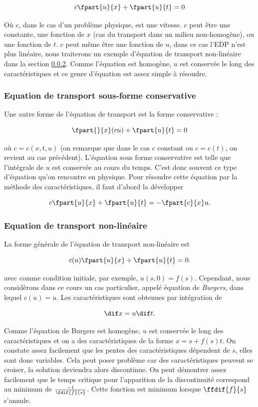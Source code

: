 $$c\fpart{u}{x} + \fpart{u}{t} = 0$$

Où $c$, dans le cas d'un problème physique, est une vitesse. $c$ peut être
une constante, une fonction de $x$ (cas du transport dans un milieu non-homogène),
ou une fonction de $t$. $c$ peut même être une fonction de $u$, dans ce cas
l'EDP n'est plus linéaire, nous traiterons un exemple d'équation de transport
non-linéaire dans la section \ref{sec:burgers}. Comme l'équation est homogène,
$u$ est conservée le long des caractéristiques et ce genre d'équation est assez
simple à résoudre.

\subsubsection{Equation de transport sous-forme conservative}
Une autre forme de l'équation de transport est la forme conservative :

$$\fpart{}{x}(cu) + \fpart{u}{t} = 0$$

où $c = c(x,t,u)$ (on remarque que dans le cas $c$ constant ou $c = c(t)$,
on revient au cas précédent). L'équation sous forme conservative est telle
que l'intégrale de $u$ est conservée au cours du temps. C'est donc souvent
ce type d'équation qu'on rencontre en physique. Pour résoudre cette équation
par la méthode des caractéristiques, il faut d'abord la développer

$$c\fpart{u}{x} + \fpart{u}{t} = -\fpart{c}{x}u.$$

\subsubsection{Equation de transport non-linéaire}
\label{sec:burgers}
La forme générale de l'équation de transport non-linéaire est

$$c(u)\fpart{u}{x} + \fpart{u}{t} = 0.$$

avec comme condition initiale, par exemple, $u(s, 0) = f(s)$.
Cependant, nous considèrons dans ce cours un cas particulier, appelé
équation de \textit{Burgers}, dans lequel $c(u) = u$.
Les caractéristiques sont obtenues par intégration de

$$\dif x = u\dif t.$$

Comme l'équation de Burgers est homogène, $u$ est conservée
le long des caractéristiques et on a des caractéristiques de la forme
$x = s + f(s)t$. On constate assez facilement que les pentes des
caractéristiques dépendent de $s$, elles sont donc variables. Cela
peut poser problème car des caractéristiques peuvent se croiser, la
solution deviendra alors discontinue. On peut démontrer assez facilement
que le temps critique pour l'apparition de la discontinuité correspond
au minimum de $\frac{-1}{\fdif{f}{s}}$. Cette fonction est minimum
lorsque $\ffdif{f}{s}$ s'annule.

